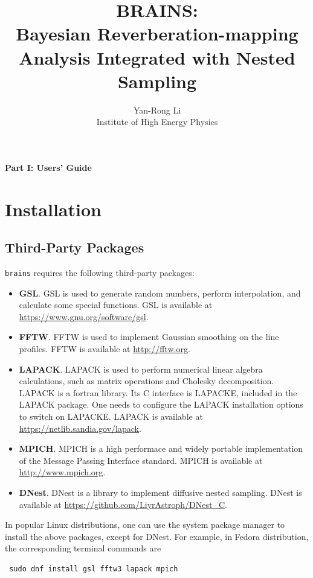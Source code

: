 \documentclass[oneside]{book}
\def\brains{{\texttt{brains}}}
\begin{document}
\title{\bf BRAINS:\\
Bayesian Reverberation-mapping Analysis Integrated
with Nested Sampling}
\author{Yan-Rong Li\\
Institute of High Energy Physics}

\maketitle
\tableofcontents
\mainmatter

\clearpage
\newpage

\vspace*{10cm}
{\Huge\centerline{\bf Part I: Users' Guide}}


\chapter{Installation}
\section{Third-Party Packages}
{\brains} requires the following third-party packages:
\begin{itemize}
 \item {\bf GSL}. GSL is used to generate random numbers, perform interpolation, and calculate some special functions. GSL is available at 
 \url{https://www.gnu.org/software/gsl}.
 
 \item {\bf FFTW}. FFTW is used to implement Gaussian smoothing on the line profiles. FFTW is available at \url{http://fftw.org}.
 
 \item {\bf LAPACK}. LAPACK is used to perform numerical linear algebra calculations, such as matrix operations and Cholesky decomposition.
 LAPACK is a fortran library. Its C interface is LAPACKE, included in the LAPACK package. One needs to configure the LAPACK installation
 options to switch on LAPACKE. LAPACK is available at \url{https://netlib.sandia.gov/lapack}.
 
 \item {\bf MPICH}. MPICH is a high performace and widely portable implementation of the Message Passing Interface standard.
 MPICH is available at \url{http://www.mpich.org}. 
 
 \item {\bf DNest}. DNest is a library to implement diffusive nested sampling. DNest is available at \url{https://github.com/LiyrAstroph/DNest_C}.
\end{itemize}
In popular Linux distributions, one can use the system package manager to install the above packages, except for DNest. For example, in Fedora distribution, 
the corresponding terminal commands are 
\begin{verbatim}
 sudo dnf install gsl fftw3 lapack mpich
\end{verbatim} 
\end{document}
